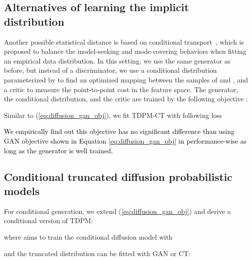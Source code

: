 \documentclass{article} \usepackage{iclr2023_conference,times}
\newcommand{\ba}[1]{}
\newcommand{\given}{\,|\,}
\def\Eqref#1{(\ref{#1})}
\def\rvc{{\mathbf{c}}}
\def\rvx{{\mathbf{x}}}
\def\rvz{{\mathbf{z}}}
\def\gL{{\mathcal{L}}}
\newcommand{\E}{\mathbb{E}}
\theoremstyle{plain}
\theoremstyle{definition}
\theoremstyle{remark}
\begin{document}
{\subsection{Alternatives of learning the implicit distribution}
Another possible statistical distance is based on conditional transport~\citep{zheng2021exploiting}, which is proposed to balance the model-seeking and mode-covering behaviors when fitting an empirical data distribution.
In this setting, we use the same generator  as before, but instead of a discriminator, we use a conditional distribution  parameterized by  to find an optimized mapping between the samples of  and , and a critic  to measure the point-to-point cost  in the feature space. The generator, the conditional distribution, and the critic are trained by the following objective :
\ba{
\min_{\psi,\eta} &\max_\phi~\! \E_{\rvx \sim q(\rvx_{T_\text{trunc}})}\! \left[ \E_{G_\psi(\rvz) \sim \pi_\eta(G_\psi(\rvz)\given \rvx_{T_\text{trunc}})} c_\phi(\rvx_{T_\text{trunc}}, G_\psi(\rvz)) \right] \notag \\
&+ \E_{\rvz \sim p(\rvz)} \left[ \E_{\rvx_{T_\text{trunc}} \sim \pi_\eta(\rvx_{T_\text{trunc}}\given G_\psi(\rvz))} c_\phi(\rvx_{T_\text{trunc}}, G_\psi(\rvz)) \right]\!. \label{eq:CT_training}
}
Similar to \Eqref{eq:diffusion_gan_obj}, we fit TDPM-CT with following loss
\ba{
\gL_{\text{TDPM}}^\text{CT} = \gL_{\text{simple\_trunc}} + \lambda \gL_{T_\text{trunc}}^\text{CT} \label{eq:diffusion_ct_obj}
.
}
\textcolor{black}{We empirically find out this objective has no significant difference than using GAN objective shown in Equation \ref{eq:diffusion_gan_obj} in performance-wise as long as the generator is well trained.}

\subsection{Conditional truncated diffusion probabilistic models}
For conditional generation, we extend \Eqref{eq:diffusion_gan_obj} and derive a conditional version of TDPM: 
\ba{
&\gL_{\text{TDPM}}^\rvc = \gL_{\text{simple\_trunc}}^\rvc + 
\lambda \gL_{T_\text{trunc}}^\rvc
\label{eq:tdpm_obj_cond},
}
where  aims to train the conditional diffusion model with  

and the truncated distribution  can be fitted with GAN or CT:
\ba{
\min_\psi \max_\phi~~~ & \E_\rvc \left[ \E_{\rvx \sim q(\rvx_{T_\text{trunc}}\given \rvc)}\! \left[\log D_\phi(\rvx\given\rvc) \right]  + \E_{\rvz \sim p(\rvz)} \left[ \log (1\!-\! D_\phi(G_\psi(\rvz, \rvc))\given \rvc) \right]\right]\!. \label{eq:gan_cond_training}
}
\ba{
\min_{\psi,\eta} \max_\phi~\! &\E_\rvc \big[ \E_{\rvx \sim q(\rvx_{T_\text{trunc}\given\rvc})}\! \left[ \E_{G_\psi(\rvz) \sim \pi_\eta(G_\psi(\rvz,\rvc)\given \rvx_{T_\text{trunc}}, \rvc)} c_\phi(\rvx_{T_\text{trunc}}, G_\psi(\rvz,\rvc)) \right] \notag \\
&+ \E_{\rvz \sim p(\rvz)} \left[ \E_{\rvx_{T_\text{trunc}} \sim \pi_\eta(\rvx_{T_\text{trunc}}\given G_\psi(\rvz,\rvc), \rvc)} c_\phi(\rvx_{T_\text{trunc}}, G_\psi(\rvz,\rvc)) \right]\big]\!. \label{eq:CT_cond_training}
}


}
\end{document}
